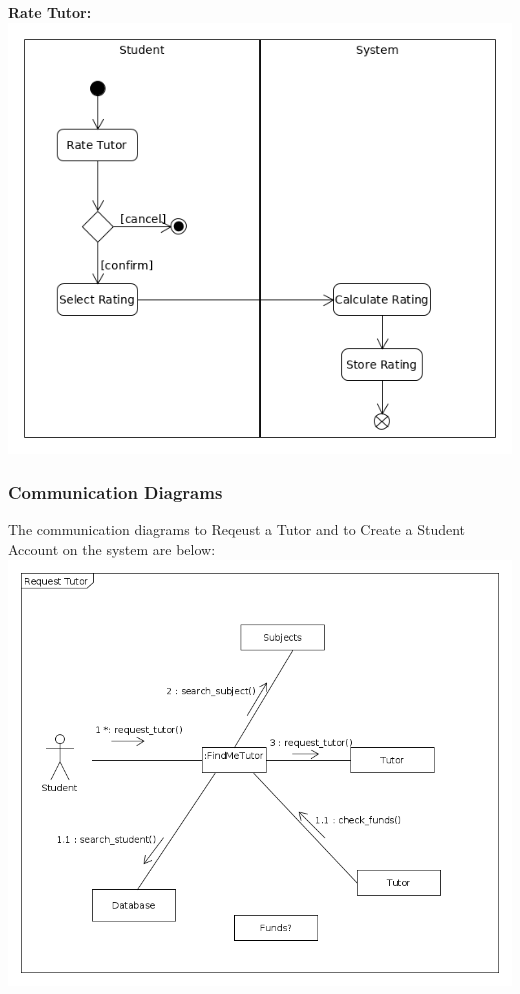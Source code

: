 \documentclass[12pt]{article}
\begin{document}
\pagebreak
\\\\\textbf{Rate Tutor:}\\
\includegraphics[width=140mm]{./activity_diagram/rate_tutor.png}
\newpage
\subsubsection{Communication Diagrams}
The communication diagrams to Reqeust a Tutor and to Create a Student Account on the system are below:\\
\includegraphics[width=140mm]{./sequence_diagram/communication_diagram_rt.png}
\newpage
\end{document}
